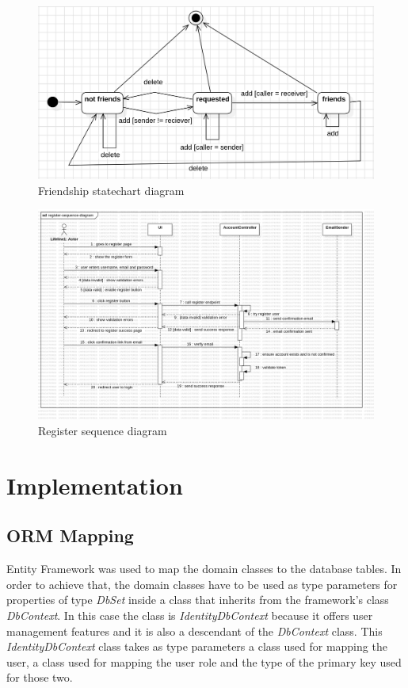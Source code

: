\begin{figure}
    \centering
    \includegraphics[width=1\linewidth]{friendship-statechartdiagram.png}
    \caption{Friendship statechart diagram}
    \label{fig:enter-label}
\end{figure}

\begin{figure}
    \centering
    \includegraphics[width=1\linewidth]{register-sequence-diagram.png}
    \caption{Register sequence diagram}
    \label{fig:enter-label}
\end{figure}

\section{Implementation}

\subsection{ORM Mapping}

\par Entity Framework was used to map the domain classes to the database tables. In order to achieve that, the domain classes have to be used as type parameters for properties of type \textit{DbSet} inside a class that inherits from the framework's class \textit{DbContext}. In this case the class is \textit{IdentityDbContext} because it offers user management features and it is also a descendant of the \textit{DbContext} class. This \textit{IdentityDbContext} class takes as type parameters a class used for mapping the user, a class used for mapping the user role and the type of the primary key used for those two.

